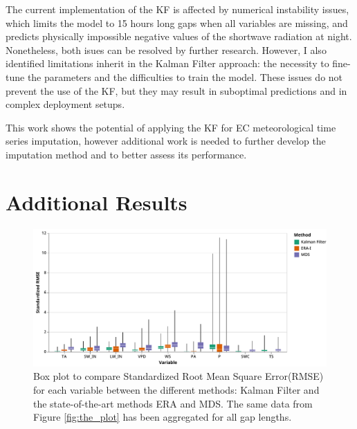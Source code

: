 \documentclass{article}
\newcommand{\imgwidth}{6in}
\let\Oldsection\section
\renewcommand{\section}{\FloatBarrier\Oldsection}
\let\Oldsubsection\subsection
\renewcommand{\subsection}{\FloatBarrier\Oldsubsection}
\begin{document}
The current implementation of the KF is affected by numerical instability issues, which limits the model to  15 hours long gaps when all variables are missing, and predicts physically impossible negative values of the shortwave radiation at night. Nonetheless, both isues can be resolved by further research. However, I also identified limitations inherit in the Kalman Filter approach: the necessity to fine-tune the parameters and the difficulties to train the model. These issues do not prevent the use of the KF, but they may result in suboptimal predictions and in complex deployment setups.

This work shows the potential of applying the KF for EC meteorological time series imputation, however additional work is needed to further develop the imputation method and to better assess its performance. 

\printbibliography

\pagebreak

\appendix

\renewcommand\thefigure{\thesection.\arabic{figure}}
\renewcommand\thetable{\thesection.\arabic{table}}
\renewcommand\theequation{\thesection.\arabic{equation}}

\FloatBarrier

\section{Additional Results}

\setcounter{figure}{0}
\setcounter{table}{0}


\begin{figure}[H]
    \centerline{\includegraphics[width=\imgwidth]{the_plot_stand}}
\caption{Box plot to compare Standardized Root Mean Square Error(RMSE) for each variable between the different methods: Kalman Filter and the state-of-the-art methods ERA and MDS. The same data from Figure \ref{fig:the_plot} has been aggregated for all gap lengths.}
\label{fig:the_plot_stand}
\end{figure}
\end{document}
